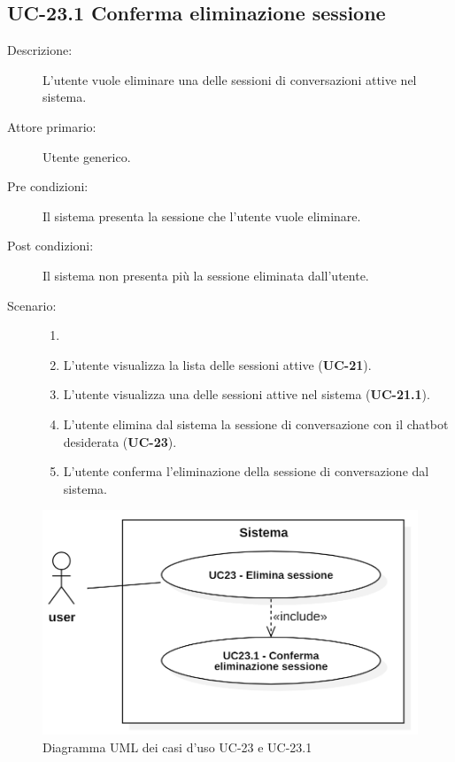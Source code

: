 \subsection{UC-23.1 Conferma eliminazione sessione}
\begin{description}
    \item[Descrizione:] L'utente vuole eliminare una delle sessioni di conversazioni attive nel sistema.
    \item[Attore primario:] Utente generico.
    \item[Pre condizioni:] Il sistema presenta la sessione che l'utente vuole eliminare.
    \item[Post condizioni:] Il sistema non presenta più la sessione eliminata dall'utente.
    \item[Scenario:] 
    \begin{enumerate}
        \item[]
        \item L'utente visualizza la lista delle sessioni attive (\textbf{UC-21}).
        \item L'utente visualizza una delle sessioni attive nel sistema (\textbf{UC-21.1}).
        \item L'utente elimina dal sistema la sessione di conversazione con il chatbot desiderata (\textbf{UC-23}).
        \item L'utente conferma l'eliminazione della sessione di conversazione dal sistema.
    \end{enumerate}
\end{description}

\begin{figure}[H]
    \centering
    \includegraphics[width=0.9\linewidth]{UC23.png} %
    \caption{Diagramma UML dei casi d'uso UC-23 e UC-23.1}
    \label{fig:UC26-27}
\end{figure}

